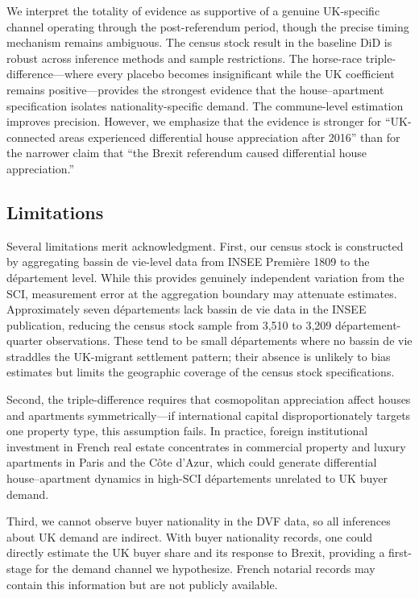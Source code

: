 \documentclass[12pt]{article}
\begin{document}
We interpret the totality of evidence as supportive of a genuine UK-specific channel operating through the post-referendum period, though the precise timing mechanism remains ambiguous. The census stock result in the baseline DiD is robust across inference methods and sample restrictions. The horse-race triple-difference---where every placebo becomes insignificant while the UK coefficient remains positive---provides the strongest evidence that the house--apartment specification isolates nationality-specific demand. The commune-level estimation improves precision. However, we emphasize that the evidence is stronger for ``UK-connected areas experienced differential house appreciation after 2016'' than for the narrower claim that ``the Brexit referendum caused differential house appreciation.''

\subsection{Limitations}

Several limitations merit acknowledgment. First, our census stock is constructed by aggregating bassin de vie-level data from INSEE Premi\`ere 1809 to the d\'epartement level. While this provides genuinely independent variation from the SCI, measurement error at the aggregation boundary may attenuate estimates. Approximately seven d\'epartements lack bassin de vie data in the INSEE publication, reducing the census stock sample from 3,510 to 3,209 département-quarter observations. These tend to be small d\'epartements where no bassin de vie straddles the UK-migrant settlement pattern; their absence is unlikely to bias estimates but limits the geographic coverage of the census stock specifications.

Second, the triple-difference requires that cosmopolitan appreciation affect houses and apartments symmetrically---if international capital disproportionately targets one property type, this assumption fails. In practice, foreign institutional investment in French real estate concentrates in commercial property and luxury apartments in Paris and the C\^ote d'Azur, which could generate differential house--apartment dynamics in high-SCI d\'epartements unrelated to UK buyer demand.

Third, we cannot observe buyer nationality in the DVF data, so all inferences about UK demand are indirect. With buyer nationality records, one could directly estimate the UK buyer share and its response to Brexit, providing a first-stage for the demand channel we hypothesize. French notarial records may contain this information but are not publicly available.
\end{document}
